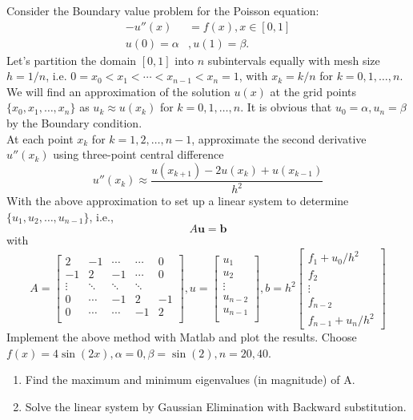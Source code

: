 \documentclass[10pt]{jhwhw}
\begin{document}
	Consider the Boundary value problem for the Poisson equation:
	\begin{align*}
		-u''(x) &= f(x), x\in [0,1] \\
		u(0) = \alpha&, u(1) = \beta.
	\end{align*}
	Let's partition the domain $[0,1]$ into $n$ subintervals equally with mesh size
	$h=1/n$, i.e. $0=x_0 < x_1 < \cdots < x_{n-1} < x_n = 1$, with $x_k = k/n$ for
	$k = 0, 1, \ldots, n$. We will find an approximation of the solution $u(x)$ at the grid
	points $\{x_0, x_1, \ldots, x_n\}$ as $u_k \approx u(x_k)$ for $k=0,1,\ldots,n$.
	It is obvious that $u_0 = \alpha, u_n = \beta$ by the Boundary condition. \\
	At each point $x_k$ for $k=1,2,\ldots,n-1$, approximate the second derivative $u''(x_k)$
	using three-point central difference
	$$
		u''(x_k) \approx \frac{u(x_{k+1}) - 2u(x_k) + u(x_{k-1})}{h^2}
	$$
	With the above approximation to set up a linear system to determine
	$\{u_1, u_2, \ldots, u_{n-1}\}$, i.e.,
	$$
		A\mathbf{u} = \mathbf{b}
	$$
	with 
	$$
	A = \begin{bmatrix}
		2 & -1 & \cdots & \cdots & 0 \\
		-1 & 2 & -1 & \cdots & 0 \\
		\vdots & \ddots & \ddots & \ddots & \\
		0 & \cdots & -1 & 2 & -1 \\
		0 & \cdots & \cdots & -1 & 2 \\
	\end{bmatrix},
	u = \begin{bmatrix}
		u_1 \\
		u_2 \\
		\vdots \\
		u_{n-2} \\
		u_{n-1} \\
	\end{bmatrix},
	b = h^2\begin{bmatrix}
		f_1 + u_0/h^2 \\
		f_2 \\
		\vdots \\
		f_{n-2} \\
		f_{n-1} + u_n/h^2
	\end{bmatrix}
	$$
	Implement the above method with Matlab and plot the results. 
	Choose $f(x) = 4\sin(2x), \alpha = 0, \beta = \sin(2), n=20,40$.
	\begin{enumerate}
		\item Find the maximum and minimum eigenvalues (in magnitude) of A.
		\item Solve the linear system by Gaussian Elimination with Backward substitution.
	\end{enumerate}
\end{document}
